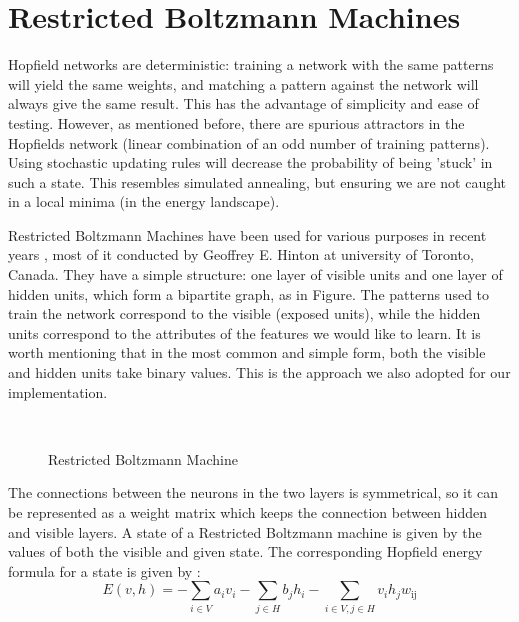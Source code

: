 
\newcommand{\nocomma}{}
\newcommand{\noplus}{}
\newcommand{\tmop}[1]{\ensuremath{\operatorname{#1}}}
\newcommand{\tmtextbf}[1]{{\bfseries{#1}}}
\newcommand{\tmtextit}[1]{{#1}}
\newcommand{\tmtexttt}[1]{{\ttfamily{#1}}}
\newenvironment{descriptioncompact}{\begin{description} }{\end{description}}


\section{Restricted Boltzmann Machines}

Hopfield networks are deterministic: training a network with the same patterns
will yield the same weights, and matching a pattern against the network will
always give the same result. This has the advantage of simplicity and ease of
testing. However, as mentioned before, there are spurious attractors in the
Hopfields network (linear combination of an odd number of training patterns).
Using stochastic updating rules will decrease the probability of being 'stuck'
in such a state. This resembles simulated annealing, but ensuring we are not
caught in a local minima (in the energy landscape).

Restricted Boltzmann Machines have been used for various purposes in recent
years
\cite{louradour2011classification} \cite{teh2001rate} \cite{nair2010rectified}
, most of it
conducted by Geoffrey E. Hinton at university of Toronto, Canada. They have a
simple structure: one layer of visible units and one layer of hidden units,
which form a bipartite graph, as in Figure. The patterns used to train the
network correspond to the visible (exposed units), while the hidden units
correspond to the attributes of the features we would like to learn. It is
worth mentioning that in the most common and simple form, both the visible and
hidden units take binary values. This is the approach we also adopted for our
implementation.

\ \ \ \ \ \ \ \ \ \ \ \ \ \ \ \ \ \ \ \ \ \ \ \ \ \ \ \ \begin{figure}[h]
  \centering
  \caption{Restricted Boltzmann Machine}
\end{figure}


The connections between the neurons in the two layers is symmetrical, so it
can be represented as a weight matrix which keeps the connection between hidden
and visible layers. A state of a Restricted Boltzmann machine is given by the
values of both the visible and given state. The corresponding Hopfield energy
formula for a state is given by :
\[ E (v, h) = - \sum_{i \in V} a_i v_i - \sum_{j \in H} b_j h_i - \sum_{i \in
   V, \nocomma j \in H \nocomma} v_i h_j w_{\tmtextit{\tmtextit{\tmop{ij}}}}
\]


